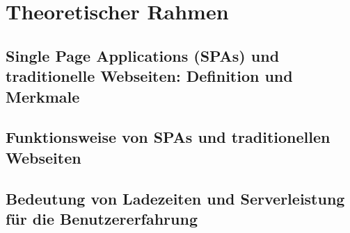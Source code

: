 \section{Theoretischer Rahmen}
\subsection{Single Page Applications (SPAs) und traditionelle Webseiten: Definition und Merkmale}
\subsection{Funktionsweise von SPAs und traditionellen Webseiten}
\subsection{Bedeutung von Ladezeiten und Serverleistung für die Benutzererfahrung}
